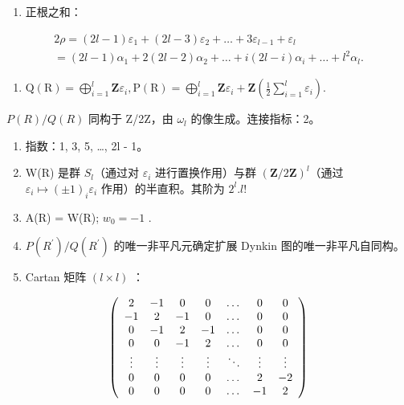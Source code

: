 \begin{enumerate}
\def\labelenumi{(\Roman{enumi})}
\setcounter{enumi}{6}
\tightlist
\item
  正根之和：
\end{enumerate}

\[
\begin{array}{l} 2 \rho = (2 l - 1) \varepsilon_ {1} + (2 l - 3) \varepsilon_ {2} + \dots + 3 \varepsilon_ {l - 1} + \varepsilon_ {l} \\ = (2 l - 1) \alpha_ {1} + 2 (2 l - 2) \alpha_ {2} + \dots + i (2 l - i) \alpha_ {i} + \dots + l ^ {2} \alpha_ {l}. \end{array}
\]

\begin{enumerate}
\def\labelenumi{(\Roman{enumi})}
\setcounter{enumi}{7}
\tightlist
\item
  \(\mathrm{Q}(\mathrm{R}) = \bigoplus_{i=1}^{l}\mathbf{Z}\varepsilon_i,\mathrm{P}(\mathrm{R}) = \bigoplus_{i=1}^{l}\mathbf{Z}\varepsilon_i + \mathbf{Z}(\frac{1}{2}\sum_{i=1}^{l}\varepsilon_i).\)
\end{enumerate}

\(P(R)/Q(R)\) 同构于 Z/2Z，由 \(\omega_{l}\) 的像生成。连接指标：2。

\begin{enumerate}
\def\labelenumi{(\Roman{enumi})}
\setcounter{enumi}{8}
\item
  指数：1, 3, 5, \ldots, 2l - 1。
\item
  W(R) 是群 \(S_{l}\)（通过对 \(\varepsilon_{i}\) 进行置换作用）与群 \((\mathbf{Z}/2\mathbf{Z})^{l}\)（通过 \(\varepsilon_{i} \mapsto (\pm1)_{i}\varepsilon_{i}\) 作用）的半直积。其阶为 \(2^{l}.l!\)
\item
  A(R) = W(R); \(w_{0} = -1\) .
\item
  \(P(R^{\prime})/Q(R^{\prime})\) 的唯一非平凡元确定扩展 Dynkin 图的唯一非平凡自同构。
\item
  Cartan 矩阵 \((l \times l)\) ：
\end{enumerate}

\[
\left( \begin{array}{c c c c c c c} 2 & - 1 & 0 & 0 & \dots & 0 & 0 \\ - 1 & 2 & - 1 & 0 & \dots & 0 & 0 \\ 0 & - 1 & 2 & - 1 & \dots & 0 & 0 \\ 0 & 0 & - 1 & 2 & \dots & 0 & 0 \\ \vdots & \vdots & \vdots & \vdots & \ddots & \vdots & \vdots \\ 0 & 0 & 0 & 0 & \dots & 2 & - 2 \\ 0 & 0 & 0 & 0 & \dots & - 1 & 2 \end{array} \right)
\]

